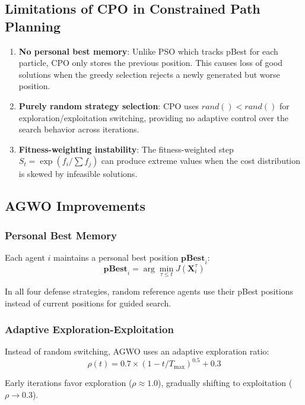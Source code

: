 \documentclass[12pt,a4paper]{article}
\begin{document}
\subsection{Limitations of CPO in Constrained Path Planning}
\begin{enumerate}
    \item \textbf{No personal best memory}: Unlike PSO which tracks pBest for 
          each particle, CPO only stores the previous position. This causes 
          loss of good solutions when the greedy selection rejects a newly 
          generated but worse position.
    \item \textbf{Purely random strategy selection}: CPO uses $rand() < rand()$ 
          for exploration/exploitation switching, providing no adaptive control 
          over the search behavior across iterations.
    \item \textbf{Fitness-weighting instability}: The fitness-weighted step 
          $S_t = \exp(f_i / \sum f_j)$ can produce extreme values when the 
          cost distribution is skewed by infeasible solutions.
\end{enumerate}

\subsection{AGWO Improvements}

\subsubsection{Personal Best Memory}
Each agent $i$ maintains a personal best position $\mathbf{pBest}_i$:
\begin{equation}
    \mathbf{pBest}_i = \arg\min_{\tau \leq t} J(\mathbf{X}_i^\tau)
\end{equation}

In all four defense strategies, random reference agents use their pBest 
positions instead of current positions for guided search.

\subsubsection{Adaptive Exploration-Exploitation}
Instead of random switching, AGWO uses an adaptive exploration ratio:
\begin{equation}
    \rho(t) = 0.7 \times (1 - t/T_{\max})^{0.5} + 0.3
\end{equation}

Early iterations favor exploration ($\rho \approx 1.0$), 
gradually shifting to exploitation ($\rho \rightarrow 0.3$).
\end{document}
